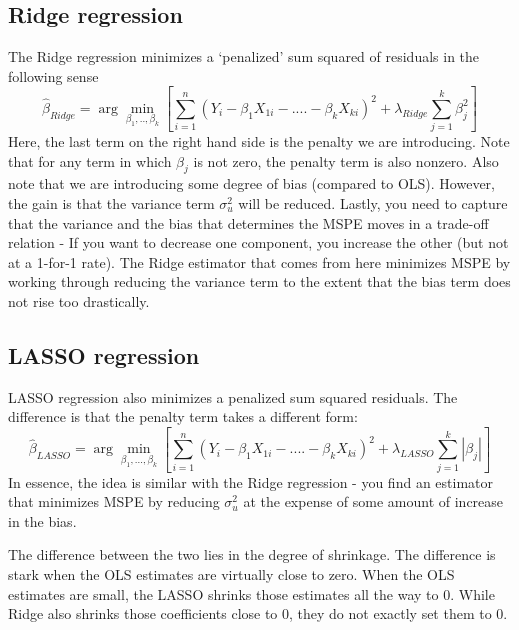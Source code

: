 \documentclass[12pt]{article}
\theoremstyle{definition}
\theoremstyle{property}
\theoremstyle{assumption}
\theoremstyle{example}
\theoremstyle{comment}
\begin{document}
\subsection{Ridge regression}
The Ridge regression minimizes a `penalized' sum squared of residuals in the following sense
\[
\hat{\beta}_{Ridge}=\arg\min_{\beta_1,..,\beta_k}\left[ \sum_{i=1}^n(Y_i - \beta_1X_{1i}-....-\beta_kX_{ki})^2 + \lambda_{Ridge}\sum_{j=1}^k\beta_j^2\right]
\]
Here, the last term on the right hand side is the penalty we are introducing. Note that for any term in which $\beta_j$ is not zero, the penalty term is also nonzero. Also note that we are introducing some degree of bias (compared to OLS). However, the gain is that the variance term $\sigma_u^2$ will be reduced. Lastly, you need to capture that the variance and the bias that determines the MSPE moves in a trade-off relation - If you want to decrease one component, you increase the other (but not at a 1-for-1 rate). The Ridge estimator that comes from here minimizes MSPE by working through reducing the variance term to the extent that the bias term does not rise too drastically. 

\subsection{LASSO regression}
LASSO regression also minimizes a penalized sum squared residuals. The difference is that the penalty term takes a different form: 
\[
\hat{\beta}_{LASSO}=\arg\min_{\beta_1,...,\beta_k}\left[ \sum_{i=1}^n(Y_i - \beta_1X_{1i}-....-\beta_kX_{ki})^2 + \lambda_{LASSO}\sum_{j=1}^k |\beta_j|\right]
\]
In essence, the idea is similar with the Ridge regression - you find an estimator that minimizes MSPE by reducing $\sigma_u^2$ at the expense of some amount of increase in the bias. 
\par\medskip
The difference between the two lies in the degree of shrinkage. The difference is stark when the OLS estimates are virtually close to zero. When the OLS estimates are small, the LASSO shrinks those estimates all the way to 0. While Ridge also shrinks those coefficients close to 0, they do not exactly set them to 0. 
\end{document}
